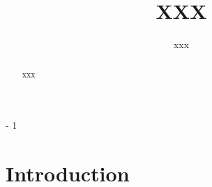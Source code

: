 \documentclass[12pt,letterpaper]{article}
\newcommand{\MyTabs}{ \hspace*{15.mm} \= ... \kill }
\begin{document}
\renewcommand{\refname}{REFERENCES}

\title{XXX}

\author {xxx}%

\date{}

\maketitle

\begin{abstract}
\noindent{}
xxx
\end{abstract}



\looseness - 1




\section*{Introduction}
\end{document}
